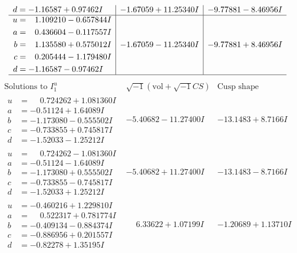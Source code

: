 \documentclass[1p]{elsarticle_modified}
\theoremstyle{definition}
\newcommand{\I}{\sqrt{-1}}
\begin{document}
$$\begin{array}{c|c|c}
\begin{aligned}
d &= -1.16587 + 0.97462 I\end{aligned}
 & -1.67059 + 11.25340 I & -9.77881 - 8.46956 I \\ \hline\begin{aligned}
u &= \phantom{-}1.109210 - 0.657844 I \\
a &= \phantom{-}0.436604 - 0.117557 I \\
b &= \phantom{-}1.135580 + 0.575012 I \\
c &= \phantom{-}0.205444 - 1.179480 I \\
d &= -1.16587 - 0.97462 I\end{aligned}
 & -1.67059 - 11.25340 I & -9.77881 + 8.46956 I\\
 \hline 
 \end{array}$$\newpage$$\begin{array}{c|c|c}  
\text{Solutions to }I^u_{1}& \I (\text{vol} + \sqrt{-1}CS) & \text{Cusp shape}\\
 \hline 
\begin{aligned}
u &= \phantom{-}0.724262 + 1.081360 I \\
a &= -0.51124 + 1.64089 I \\
b &= -1.173080 - 0.555502 I \\
c &= -0.733855 + 0.745817 I \\
d &= -1.52033 - 1.25212 I\end{aligned}
 & -5.40682 - 11.27400 I & -13.1483 + 8.7166 I \\ \hline\begin{aligned}
u &= \phantom{-}0.724262 - 1.081360 I \\
a &= -0.51124 - 1.64089 I \\
b &= -1.173080 + 0.555502 I \\
c &= -0.733855 - 0.745817 I \\
d &= -1.52033 + 1.25212 I\end{aligned}
 & -5.40682 + 11.27400 I & -13.1483 - 8.7166 I \\ \hline\begin{aligned}
u &= -0.460216 + 1.229810 I \\
a &= \phantom{-}0.522317 + 0.781774 I \\
b &= -0.409134 - 0.884374 I \\
c &= -0.886956 + 0.201557 I \\
d &= -0.82278 + 1.35195 I\end{aligned}
 & \phantom{-}6.33622 + 1.07199 I & -1.20689 + 1.13710 I \\ \hline\begin{aligned}

\end{aligned}
\end{array}$$
\end{document}
